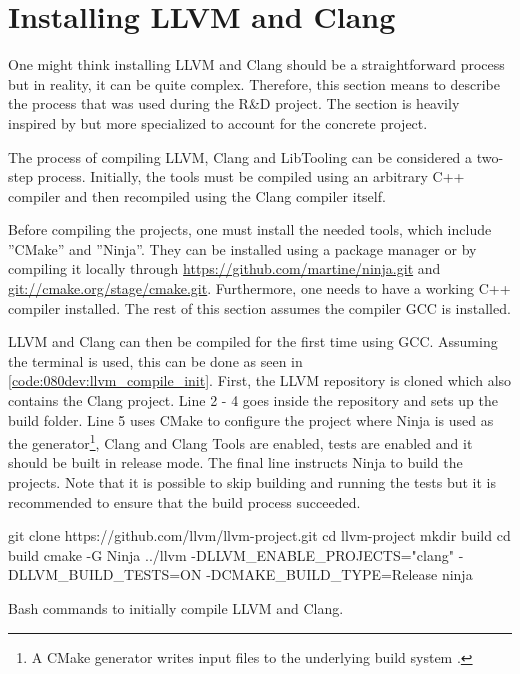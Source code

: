 \section{Installing LLVM and Clang}
One might think installing LLVM and Clang should be a straightforward process but in reality, it can be quite complex. Therefore, this section means to describe the process that was used during the R\&D project. The section is heavily inspired by \cite{clangTutorialBuildingTools} but more specialized to account for the concrete project.

The process of compiling LLVM, Clang and LibTooling can be considered a two-step process. Initially, the tools must be compiled using an arbitrary C++ compiler and then recompiled using the Clang compiler itself.

Before compiling the projects, one must install the needed tools, which include ''CMake'' and ''Ninja''. They can be installed using a package manager or by compiling it locally through \url{https://github.com/martine/ninja.git} and \url{git://cmake.org/stage/cmake.git}. Furthermore, one needs to have a working C++ compiler installed. The rest of this section assumes the compiler GCC is installed.


LLVM and Clang can then be compiled for the first time using GCC. Assuming the terminal is used, this can be done as seen in \cref{code:080dev:llvm_compile_init}.
First, the LLVM repository is cloned which also contains the Clang project.
Line 2 - 4 goes inside the repository and sets up the build folder.
Line 5 uses CMake to configure the project where Ninja is used as the generator\footnote{A CMake generator writes input files to the underlying build system \cite{cmakeCmakegeneratorsCMake26}.}, Clang and Clang Tools are enabled, tests are enabled and it should be built in release mode. The final line instructs Ninja to build the projects. Note that it is possible to skip building and running the tests but it is recommended to ensure that the build process succeeded.

\begin{listing}[H]
    \begin{bashcode}
git clone https://github.com/llvm/llvm-project.git
cd llvm-project
mkdir build
cd build
cmake -G Ninja ../llvm -DLLVM_ENABLE_PROJECTS="clang" -DLLVM_BUILD_TESTS=ON -DCMAKE_BUILD_TYPE=Release
ninja
    \end{bashcode}
    \caption{Bash commands to initially compile LLVM and Clang.}
    \label{code:080dev:llvm_compile_init}
\end{listing}

